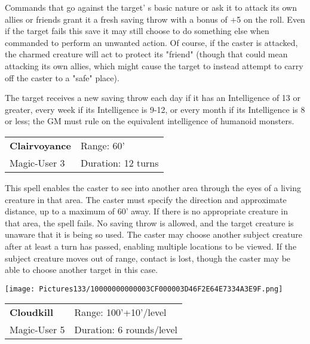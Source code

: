 \documentclass[a4paper,twoside,openany,10pt]{book}
\begin{document}
\begin{multicols}{2}
Commands that go against the target' s basic nature or ask it to attack its own allies or friends grant it a fresh saving throw with a bonus of +5 on the roll. Even if the target fails this save it may still choose to do something else when commanded to perform an unwanted action. Of course, if the caster is attacked, the charmed creature will act to protect its "friend" (though that could mean attacking its own allies, which might cause the target to instead attempt to carry off the caster to a "safe" place).

The target receives a new saving throw each day if it has an Intelligence of 13 or greater, every week if its Intelligence is 9-12, or every month if its Intelligence is 8 or less; the GM must rule on the equivalent intelligence of humanoid monsters.\medskip


\smallskip\begin{flushleft} 
	\begin{tabularx}{0.45\textwidth}{@{}m{3.5cm}m{5.5cm}@{}} 
		\textbf{Clairvoyance} & Range: 60'\\
		Magic-User 3 & Duration: 12 turns\\	
	\end{tabularx}\end{flushleft}

This spell enables the caster to see into another area through the eyes of a living creature in that area. The caster must specify the direction and approximate distance, up to a maximum of 60'{} away. If there is no appropriate creature in that area, the spell fails. No saving throw is allowed, and the target creature is unaware that it is being so used. The caster may choose another subject creature after at least a turn has passed, enabling multiple locations to be viewed. If the subject creature moves out of range, contact is lost, though the caster may be able to choose another target in this case.


\begin{flushleft}	
	\texttt{[image: Pictures133/10000000000003CF000003D46F2E64E7334A3E9F.png]}
\end{flushleft}

\smallskip\begin{flushleft} 
	\begin{tabularx}{0.45\textwidth}{@{}m{3.5cm}m{5.5cm}@{}} 
		\textbf{Cloudkill} & Range: 100'+10'/level\\
		Magic-User 5 & Duration: 6 rounds/level\\	
	\end{tabularx}\end{flushleft}


\end{multicols}
\end{document}
